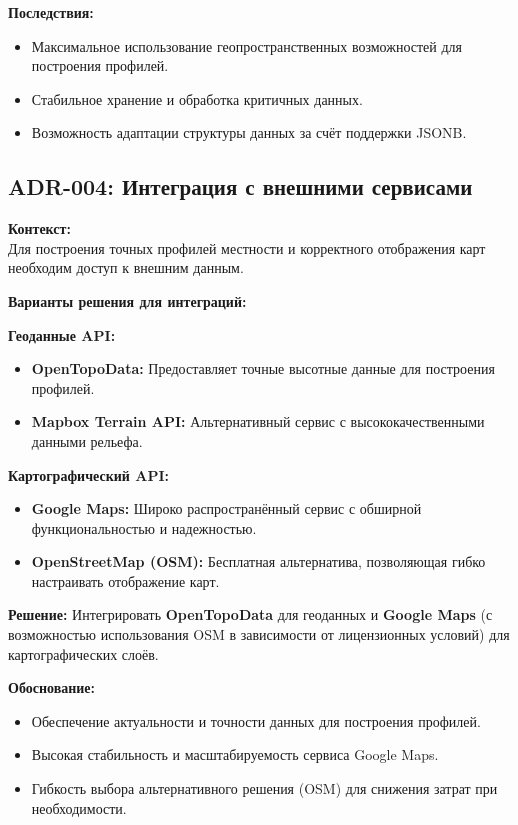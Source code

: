 \documentclass[a4paper,12pt]{article}
\begin{document}
\textbf{Последствия:}
\begin{itemize}
    \item Максимальное использование геопространственных возможностей для построения профилей.
    \item Стабильное хранение и обработка критичных данных.
    \item Возможность адаптации структуры данных за счёт поддержки JSONB.
\end{itemize}

\subsection{ADR-004: Интеграция с внешними сервисами}

\textbf{Контекст:}\\
Для построения точных профилей местности и корректного отображения карт необходим доступ к внешним данным.

\textbf{Варианты решения для интеграций:}

\textbf{Геоданные API:}
\begin{itemize}[leftmargin=1.5cm]
    \item \textbf{OpenTopoData:} Предоставляет точные высотные данные для построения профилей.
    \item \textbf{Mapbox Terrain API:} Альтернативный сервис с высококачественными данными рельефа.
\end{itemize}

\textbf{Картографический API:}
\begin{itemize}[leftmargin=1.5cm]
    \item \textbf{Google Maps:} Широко распространённый сервис с обширной функциональностью и надежностью.
    \item \textbf{OpenStreetMap (OSM):} Бесплатная альтернатива, позволяющая гибко настраивать отображение карт.
\end{itemize}

\textbf{Решение:} Интегрировать \textbf{OpenTopoData} для геоданных и \textbf{Google Maps} (с возможностью использования OSM в зависимости от лицензионных условий) для картографических слоёв.

\textbf{Обоснование:}
\begin{itemize}
    \item Обеспечение актуальности и точности данных для построения профилей.
    \item Высокая стабильность и масштабируемость сервиса Google Maps.
    \item Гибкость выбора альтернативного решения (OSM) для снижения затрат при необходимости.
\end{itemize}
\end{document}

